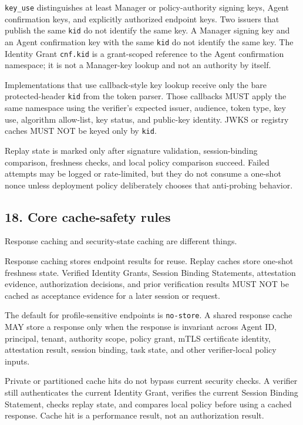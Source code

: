 \documentclass[
]{article}
\begin{document}
\texttt{key\_use} distinguishes at least Manager or policy-authority
signing keys, Agent confirmation keys, and explicitly authorized
endpoint keys. Two issuers that publish the same \texttt{kid} do not
identify the same key. A Manager signing key and an Agent confirmation
key with the same \texttt{kid} do not identify the same key. The
Identity Grant \texttt{cnf.kid} is a grant-scoped reference to the Agent
confirmation namespace; it is not a Manager-key lookup and not an
authority by itself.

Implementations that use callback-style key lookup receive only the
bare protected-header \texttt{kid} from the token parser. Those
callbacks MUST apply the same namespace using the verifier's expected
issuer, audience, token type, key use, algorithm allow-list, key status,
and public-key identity. JWKS or registry caches MUST NOT be keyed only
by \texttt{kid}.

Replay state is marked only after signature validation, session-binding
comparison, freshness checks, and local policy comparison succeed.
Failed attempts may be logged or rate-limited, but they do not consume a
one-shot nonce unless deployment policy deliberately chooses that
anti-probing behavior.

\subsection{18. Core cache-safety rules}\label{core-cache-safety-rules}

Response caching and security-state caching are different things.

Response caching stores endpoint results for reuse. Replay caches store
one-shot freshness state. Verified Identity Grants, Session Binding
Statements, attestation evidence, authorization decisions, and prior
verification results MUST NOT be cached as acceptance evidence for a
later session or request.

The default for profile-sensitive endpoints is \texttt{no-store}. A
shared response cache MAY store a response only when the response is
invariant across Agent ID, principal, tenant, authority scope, policy
grant, mTLS certificate identity, attestation result, session binding,
task state, and other verifier-local policy inputs.

Private or partitioned cache hits do not bypass current security checks.
A verifier still authenticates the current Identity Grant, verifies the
current Session Binding Statement, checks replay state, and compares
local policy before using a cached response. Cache hit is a performance
result, not an authorization result.
\end{document}
